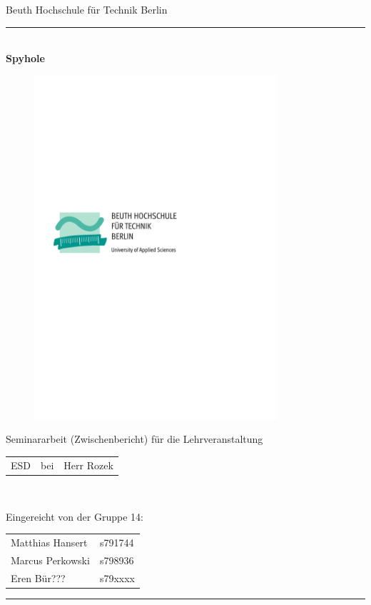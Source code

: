 

\begin{titlepage}
	\begin{center}
		\Large
		Beuth Hochschule für Technik Berlin
		\textcolor{darkBHT}{\rule{\textwidth}{0.2cm}} \\
		\vspace{2 cm}
		\Huge
		\textbf{Spyhole}
		\vspace{2 cm}
		
		\begin{figure}[htbp]
			\centering 
			\includegraphics[width=9cm]{BHT-Logo-Basis.pdf}  
		\end{figure}
		
		\vspace{3cm}
		\Large
		Seminararbeit (Zwischenbericht) für die Lehrveranstaltung \\
		\begin{tabular}{lcl}
			ESD & bei & Herr Rozek\\
		\end{tabular} 
		\\
		\vspace{0.8cm}
		\vspace{0.8cm}
		
		Eingereicht von der Gruppe 14: \\
		\begin{tabular}{ll}
			Matthias Hansert & s791744\\
			Marcus Perkowski & s798936\\
			Eren Bür??? & s79xxxx\\
		\end{tabular}

	\end{center}
	\vfill
	\textcolor{darkBHT}{\rule{\textwidth}{0.2cm}}
	\vspace{1 cm}
	\normalsize
	
\end{titlepage}

%
%